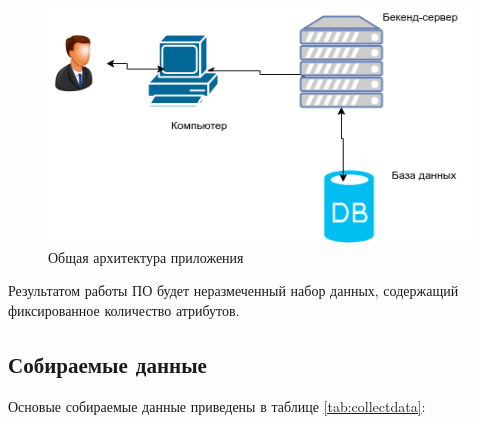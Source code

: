 \begin{figure}[h]
	\centering
	\includegraphics[width=.5\textwidth]{diagrams/diagram2.png}
	\caption{Общая архитектура приложения}\label{cha:design}
	\label{fig07}
\end{figure}
Результатом работы ПО будет неразмеченный набор данных, содержащий фиксированное количество атрибутов.
\subsection{Собираемые данные}
Основые собираемые данные приведены в таблице \ref{tab:collectdata}:

